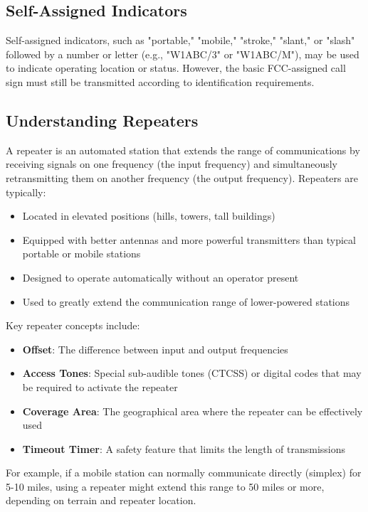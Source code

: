 \subsection*{Self-Assigned Indicators}
Self-assigned indicators, such as "portable," "mobile," "stroke," "slant," or "slash" followed by a number or letter (e.g., "W1ABC/3" or "W1ABC/M"), may be used to indicate operating location or status. However, the basic FCC-assigned call sign must still be transmitted according to identification requirements.

\subsection*{Understanding Repeaters}
A repeater is an automated station that extends the range of communications by receiving signals on one frequency (the input frequency) and simultaneously retransmitting them on another frequency (the output frequency). Repeaters are typically:

\begin{itemize}
    \item Located in elevated positions (hills, towers, tall buildings)
    \item Equipped with better antennas and more powerful transmitters than typical portable or mobile stations
    \item Designed to operate automatically without an operator present
    \item Used to greatly extend the communication range of lower-powered stations
\end{itemize}

Key repeater concepts include:
\begin{itemize}
    \item \textbf{Offset}: The difference between input and output frequencies
    \item \textbf{Access Tones}: Special sub-audible tones (CTCSS) or digital codes that may be required to activate the repeater
    \item \textbf{Coverage Area}: The geographical area where the repeater can be effectively used
    \item \textbf{Timeout Timer}: A safety feature that limits the length of transmissions
\end{itemize}

For example, if a mobile station can normally communicate directly (simplex) for 5-10 miles, using a repeater might extend this range to 50 miles or more, depending on terrain and repeater location.

